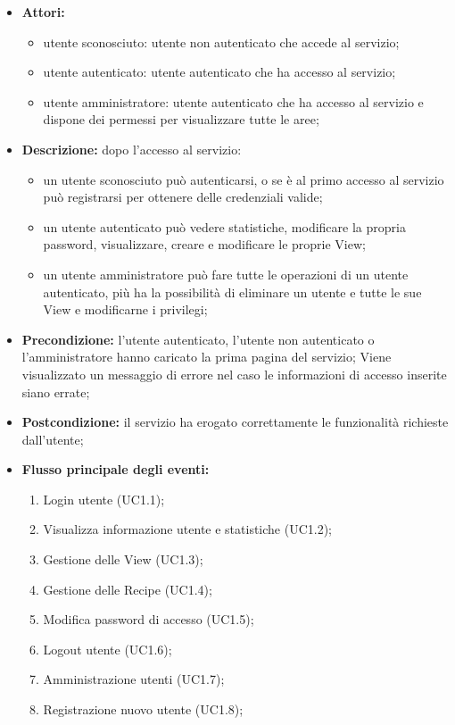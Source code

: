 \begin{itemize}
    \item \textbf{Attori:}
    \begin{itemize}
    	\item utente sconosciuto: utente non autenticato che accede al servizio;
    	\item utente autenticato: utente autenticato che ha accesso al servizio;
    	\item utente amministratore: utente autenticato che ha accesso al servizio e dispone dei permessi per visualizzare tutte le aree;
	\end{itemize}
    \item \textbf{Descrizione:} dopo l'accesso al servizio:
    \begin{itemize}
    	\item un utente sconosciuto può autenticarsi, o se è al primo accesso al servizio può registrarsi per ottenere delle credenziali valide;
    	\item un utente autenticato può vedere statistiche, modificare la propria password, visualizzare, creare e modificare le proprie View;
  		\item un utente amministratore può fare tutte le operazioni di un utente autenticato, più ha la possibilità di eliminare un utente e tutte le sue View e modificarne i privilegi;
	\end{itemize}
    \item \textbf{Precondizione:} l'utente autenticato, l'utente non autenticato o l'amministratore hanno caricato la prima pagina del servizio;
    Viene visualizzato un messaggio di errore nel caso le informazioni di accesso inserite siano errate;
    \item \textbf{Postcondizione:} il servizio ha erogato correttamente le funzionalità richieste dall'utente;
    \item \textbf{Flusso principale degli eventi:} 
    	\begin{enumerate}
    		\item Login utente (UC1.1);
    		\item Visualizza informazione utente e statistiche (UC1.2);
    		\item Gestione delle View (UC1.3);
    		\item Gestione delle Recipe (UC1.4);
    		\item Modifica password di accesso (UC1.5);
    		\item Logout utente (UC1.6);
    		\item Amministrazione utenti (UC1.7);
    		\item Registrazione nuovo utente (UC1.8);
    	\end{enumerate}
\end{itemize}

